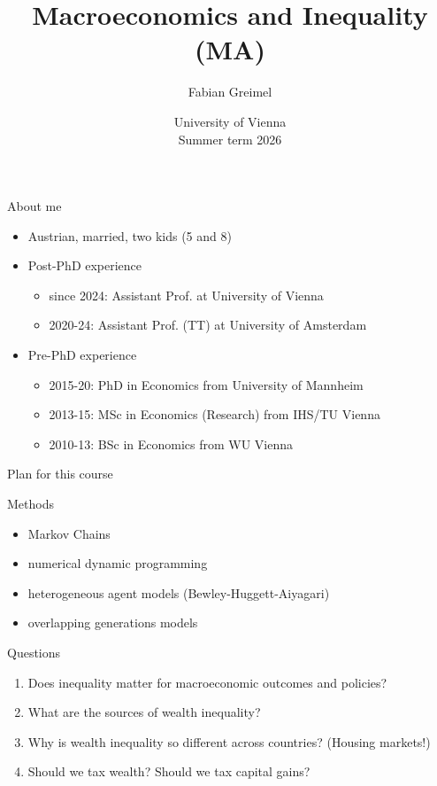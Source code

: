\documentclass[aspectratio=169,mathserif]{beamer}
\author{Fabian Greimel}
\title{Macroeconomics and Inequality (MA)}
\date{University of Vienna \\ Summer term 2026}
\begin{document}
 
\frame[plain]{\maketitle}

\begin{frame}{About me}

  \begin{itemize}
  \item Austrian, married, two kids (5 and 8)
  \item Post-PhD experience
  \begin{itemize}
    \item since 2024: Assistant Prof. at University of Vienna
    \item 2020-24: Assistant Prof. (TT) at University of Amsterdam
  \end{itemize}
  \item Pre-PhD experience
  \begin{itemize}
    \item 2015-20: PhD in Economics from University of Mannheim
    \item 2013-15: MSc in Economics (Research) from IHS/TU Vienna
    \item 2010-13: BSc in Economics from WU Vienna
  \end{itemize}
\end{itemize}
\end{frame}
\begin{frame}{Plan for this course}

\begin{block}{Methods}
  \begin{itemize}
    \item Markov Chains
    \item numerical dynamic programming
    \item heterogeneous agent models (Bewley-Huggett-Aiyagari)
    \item overlapping generations models
  \end{itemize}
\end{block}

\begin{block}{Questions}
    \begin{enumerate}
      \item Does inequality matter for macroeconomic outcomes and policies?
      \item What are the sources of wealth inequality?
      \item Why is wealth inequality so different across countries? (Housing markets!)
      \item Should we tax wealth? Should we tax capital gains?
    \end{enumerate}
  \end{block}
\end{frame}
\end{document}
